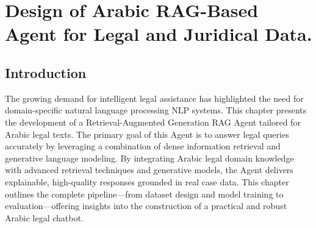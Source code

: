 \chapter{Design of Arabic RAG-Based Agent for Legal and Juridical Data.}
\pagestyle{fancy}
\pagestyle{fancy}\chead{} \pagestyle{fancy}\rhead{}
\pagestyle{fancy}\cfoot{} \pagestyle{fancy}\rfoot{\thepage}
\section{Introduction}\label{start4}
The growing demand for intelligent legal assistance has highlighted the need for domain-specific natural language processing NLP systems. This chapter presents the development of a Retrieval-Augmented Generation RAG Agent tailored for Arabic legal texts. The primary goal of this Agent is to answer legal queries accurately by leveraging a combination of dense information retrieval and generative language modeling. By integrating Arabic legal domain knowledge with advanced retrieval techniques and generative models, the Agent delivers explainable, high-quality responses grounded in real case data. This chapter outlines the complete pipeline—from dataset design and model training to evaluation—offering insights into the construction of a practical and robust Arabic legal chatbot.


